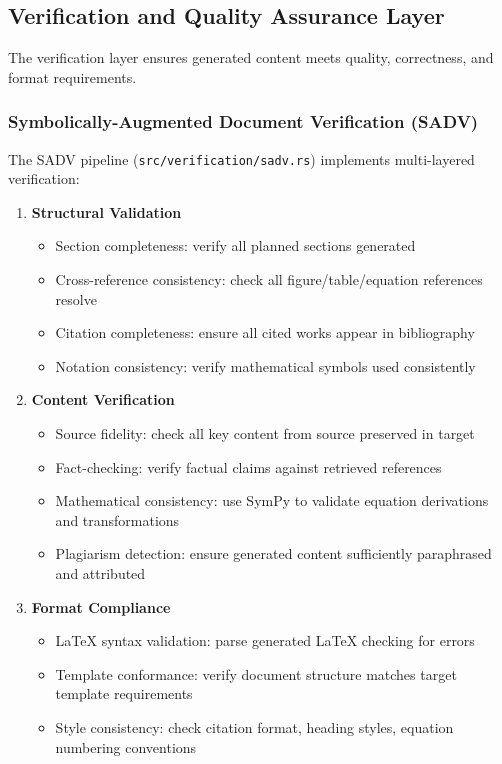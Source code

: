 \documentclass{ieeeaccess}
\begin{document}
\subsection{Verification and Quality Assurance Layer}

The verification layer ensures generated content meets quality, correctness, and format requirements.

\subsubsection{Symbolically-Augmented Document Verification (SADV)}

The SADV pipeline (\texttt{src/verification/sadv.rs}) implements multi-layered verification:

\begin{enumerate}
\item \textbf{Structural Validation}
\begin{itemize}
\item Section completeness: verify all planned sections generated
\item Cross-reference consistency: check all figure/table/equation references resolve
\item Citation completeness: ensure all cited works appear in bibliography
\item Notation consistency: verify mathematical symbols used consistently
\end{itemize}

\item \textbf{Content Verification}
\begin{itemize}
\item Source fidelity: check all key content from source preserved in target
\item Fact-checking: verify factual claims against retrieved references
\item Mathematical consistency: use SymPy to validate equation derivations and transformations
\item Plagiarism detection: ensure generated content sufficiently paraphrased and attributed
\end{itemize}

\item \textbf{Format Compliance}
\begin{itemize}
\item LaTeX syntax validation: parse generated LaTeX checking for errors
\item Template conformance: verify document structure matches target template requirements
\item Style consistency: check citation format, heading styles, equation numbering conventions
\end{itemize}
\end{enumerate}
\end{document}
